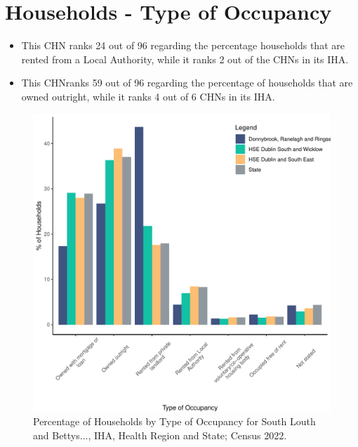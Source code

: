 \documentclass{article}
\begin{document}
\section{Households - Type of Occupancy}\label{sect:Households}
\begin{itemize}
\item This CHN ranks  24 out of 96 regarding the percentage households that are rented from a Local Authority, while it ranks  2 out of the CHNs in its IHA. 
\item This CHNranks  59 out of 96 regarding the percentage of households that are owned outright, while it ranks   4 out of 6 CHNs in its IHA.
\end{itemize}
\begin{figure}[H]
	\centering
	\includegraphics[width = 140mm]{../figures/HouseholdsED.pdf}
	\caption{Percentage of Households by Type of Occupancy for South Louth and Bettys..., IHA, Health Region and State; Census 2022.}
	\label{fig:vbnv}
	\end{figure}
\end{document}
